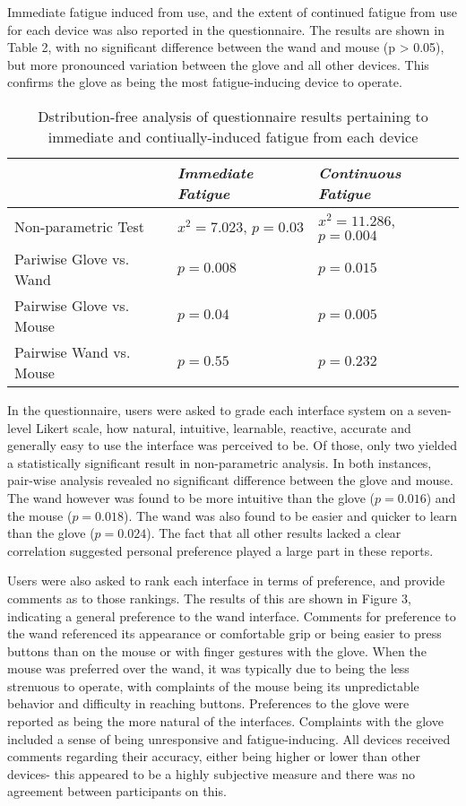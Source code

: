 Immediate fatigue induced from use, and the extent of continued fatigue from use for each device was also reported in the questionnaire. The results are shown in Table 2, with no significant difference between the wand and mouse (p > 0.05), but more pronounced variation between the glove and all other devices. This confirms the glove as being the most fatigue-inducing device to operate.

\begin{table}
\begin{tabular}{l | l | l}
& \emph{Immediate Fatigue} & \emph{Continuous Fatigue} \\
\hline
Non-parametric Test & $x^2 = 7.023$, $p = 0.03$ & $x^2 = 11.286$, $p = 0.004$ \\
Pariwise Glove vs. Wand & $p = 0.008$ & $p = 0.015$ \\
Pairwise Glove vs. Mouse & $p = 0.04$ & $p = 0.005$ \\
Pairwise Wand vs. Mouse & $p=0.55$ & $p=0.232$ \\

\end{tabular}
\caption{Dstribution-free analysis of questionnaire results pertaining to immediate and contiually-induced fatigue from each device}
\end{table}

In the questionnaire, users were asked to grade each interface system on a seven-level Likert scale, how natural, intuitive, learnable, reactive, accurate and generally easy to use the interface was perceived to be. Of those, only two yielded a statistically significant result in non-parametric analysis. In both instances, pair-wise analysis revealed no significant difference between the glove and mouse. The wand however was found to be more intuitive than the glove ($p=0.016$) and the mouse ($p=0.018$). The wand was also found to be easier and quicker to learn than the glove ($p=0.024$). The fact that all other results lacked a clear correlation suggested personal preference played a large part in these reports.

Users were also asked to rank each interface in terms of preference, and provide comments as to those rankings. The results of this are shown in Figure 3, indicating a general preference to the wand interface. Comments for preference to the wand referenced its appearance or comfortable grip or being easier to press buttons than on the mouse or with finger gestures with the glove. When the mouse was preferred over the wand, it was typically due to being the less strenuous to operate, with complaints of the mouse being its unpredictable behavior and difficulty in reaching buttons. Preferences to the glove were reported as being the more natural of the interfaces. Complaints with the glove included a sense of being unresponsive and fatigue-inducing. All devices received comments regarding their accuracy, either being higher or lower than other devices- this appeared to be a highly subjective measure and there was no agreement between participants on this.


